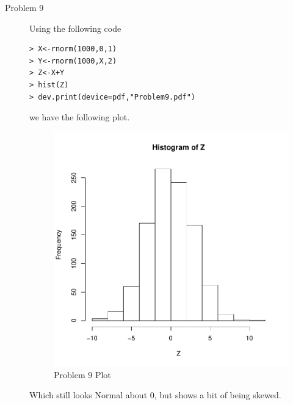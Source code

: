 \documentclass[10pt]{article}
\begin{document}
\begin{description}
\item[Problem 9]
Using the following code
\begin{lstlisting}[frame=trBL]
> X<-rnorm(1000,0,1)
> Y<-rnorm(1000,X,2)
> Z<-X+Y
> hist(Z)
> dev.print(device=pdf,"Problem9.pdf") 
\end{lstlisting}
we have the following plot.
\begin{figure}[ht!]
\centering
\includegraphics{../Problem9.pdf}\caption{Problem 9 Plot}
\end{figure}
Which still looks Normal about 0, but shows a bit of being skewed. 
\end{description}
\end{document}
